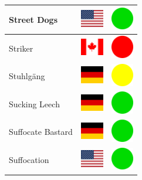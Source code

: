 \documentclass[12pt, a4paper, twoside]{report}
\begin{document}
\begin{center}
\begin{longtable}{|p{5cm}|p{2cm}|p{2cm}|}
 Street Dogs                                                & \includegraphics[width=1cm]{../img/flags/us} &   \includegraphics[width=1cm]{../likes/y} \\ \hline
 Striker                                                    & \includegraphics[width=1cm]{../img/flags/ca} &   \includegraphics[width=1cm]{../likes/n} \\ \hline
 Stuhlgäng                                                  & \includegraphics[width=1cm]{../img/flags/de} &   \includegraphics[width=1cm]{../likes/m} \\ \hline
 Sucking Leech                                              & \includegraphics[width=1cm]{../img/flags/de} &   \includegraphics[width=1cm]{../likes/y} \\ \hline
 Suffocate Bastard                                          & \includegraphics[width=1cm]{../img/flags/de} &   \includegraphics[width=1cm]{../likes/y} \\ \hline
 Suffocation                                                & \includegraphics[width=1cm]{../img/flags/us} &   \includegraphics[width=1cm]{../likes/y} \\ \hline

\end{longtable}
\end{center}
\end{document}
